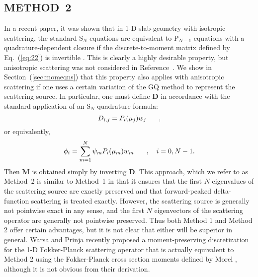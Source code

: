 \documentclass[12pt]{article}
\newcommand{\be}{\begin{equation}}
\newcommand{\ee}{\end{equation}}
\newcommand{\pec}{\hspace{0.25in},}
\newcommand{\LEQ}[1]{\label{eq:#1}}
\newcommand{\EQ}[1]{Eq.~(\ref{eq:#1})}
\newcommand{\mD}{\mathbf{D}}
\newcommand{\mM}{\mathbf{M}}
\begin{document}
\begin{center}
\section{METHOD~2}

In a recent paper, it was shown that in 1-D slab-geometry with isotropic scattering, the standard S$_N$ 
equations are equivalent to P$_{N-1}$ equations with a quadrature-dependent closure if the discrete-to-moment matrix 
defined by \EQ{22} is invertible \cite{Morel12}. This is clearly a highly desirable property, but anisotropic scattering 
was not considered in Reference~. We show in Section~(\ref{sec:momeqns}) that this property also applies with 
anisotropic scattering if one uses a certain variation of the GQ method to represent the scattering source.  In particular, 
one must define $\mD$ in accordance with the standard application of an S$_N$ quadrature formula:
\be
D_{i,j} = P_i(\mu_j) w_j \pec
\LEQ{25a}
\ee
or equivalently,
\be 
\phi_i = \sum_{m=1}^{N} \psi_m P_{i}(\mu_m) w_m \pec \quad i=0,N-1.
\LEQ{25b}
\ee
Then $\mM$ is obtained simply by inverting $\mD$. This approach, which we refer to as Method~2 is similar to Method~1 
in that it ensures that the first $N$ eigenvalues of the scattering source are exactly preserved and that forward-peaked delta-function 
scattering is treated exactly.  However, the scattering source is generally not pointwise exact in any sense, and the first $N$ eigenvectors 
of the scattering operator are generally not pointwise preserved.  Thus both Method 1 and Method 2 offer certain advantages, but it is not 
clear that either will be superior in general.  Warsa and Prinja \cite{warsa} recently proposed a moment-preserving discretization for the 1-D 
Fokker-Planck scattering operator that is actually equivalent to Method 2  using the Fokker-Planck cross section moments defined 
by Morel \cite{Morel-FP}, although it is not obvious from their derivation.


\end{center}
\end{document}
